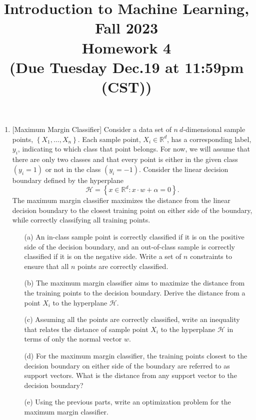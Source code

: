 \documentclass[10pt]{article}
\begin{document}
 \date{}
\title{Introduction to Machine Learning, Fall 2023 \\
	Homework 4\\
	\small (Due Tuesday Dec.19 at 11:59pm (CST))}
\maketitle

\begin{enumerate}[1.]
	   \item {} [Maximum Margin Classifier]
           Consider a data set of $n\ d$-dimensional sample points, $\left\{X_1, \ldots, X_n\right\}$. Each sample point, $X_i \in \mathbb{R}^d$, has a corresponding label, $y_i$, indicating to which class that point belongs. For now, we will assume that there are only two classes and that every point is either in the given class $\left(y_i=1\right)$ or not in the class $\left(y_i=-1\right)$. Consider the linear decision boundary defined by the hyperplane
            $$
            \mathcal{H}=\left\{x \in \mathbb{R}^d: x \cdot w+\alpha=0\right\} .
            $$
            The maximum margin classifier maximizes the distance from the linear decision boundary to the closest training point on either side of the boundary, while correctly classifying all training points.
	      \begin{itemize}

        \item[(a)] An in-class sample point is correctly classified if it is on the positive side of the decision boundary, and an out-of-class sample is correctly classified if it is on the negative side. Write a set of $n$ constraints to ensure that all $n$ points are correctly classified.~
            \item[(b)]The maximum margin classifier aims to maximize the distance from the training points to the decision boundary. Derive the distance from a point $X_i$ to the hyperplane $\mathcal{H}$.~
            \item[(c)] Assuming all the points are correctly classified, write an inequality that relates the distance of sample point $X_i$ to the hyperplane $\mathcal{H}$ in terms of only the normal vector $w$.~
            \item[(d)] For the maximum margin classifier, the training points closest to the decision boundary on either side of the boundary are referred to as support vectors. What is the distance from any support vector to the decision boundary?~
            \item[(e)] Using the previous parts, write an optimization problem for the maximum margin classifier.~
	      \end{itemize}


\end{enumerate}
\end{document}
